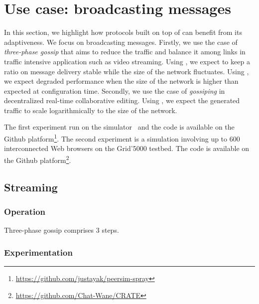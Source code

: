 
\section{Use case: broadcasting messages}


In this section, we highlight how protocols built on top of \SPRAY can benefit
from its adaptiveness. We focus on broadcasting messages. Firstly, we use the
case of \emph{three-phase gossip} that aims to reduce the traffic and balance it
among links in traffic intensive application such as video streaming. Using
\SPRAY, we expect to keep a ratio on message delivery stable while the size of
the network fluctuates. Using \CYCLON, we expect degraded performance when the
size of the network is higher than expected at configuration time. Secondly, we
use the case of \emph{gossiping} in decentralized real-time collaborative
editing. Using \SPRAY, we expect the generated traffic to scale logarithmically
to the size of the network.

The first experiment run on the \PEERSIM simulator~\cite{montresor2009peersim}
and the code is available on the Github
platform\footnote{\url{https://github.com/justayak/peersim-spray}}. The second
experiment is a simulation involving up to 600 interconnected Web browsers on
the Grid'5000 testbed. The code is available on the Github
platform\footnote{\url{https://github.com/Chat-Wane/CRATE}}.

\subsection{Streaming}


\subsubsection{Operation}

Three-phase gossip comprises 3 steps. 

\subsubsection{Experimentation}

